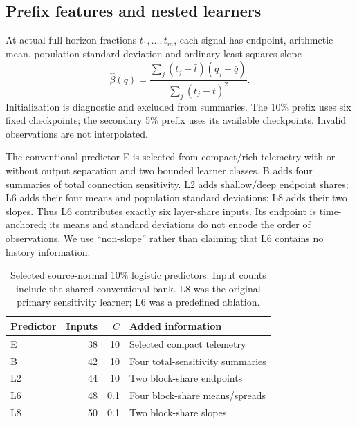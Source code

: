 \documentclass[nolineno]{ieeeaccess}
\begin{document}
\subsection{Prefix features and nested learners}
At actual full-horizon fractions $t_1,\ldots,t_m$, each signal has endpoint, arithmetic mean, population standard deviation and ordinary least-squares slope
\begin{equation}
\widehat\beta(q)=\frac{\sum_j(t_j-\bar t)(q_j-\bar q)}{\sum_j(t_j-\bar t)^2}.
\label{eq:slope}
\end{equation}
Initialization is diagnostic and excluded from summaries. The 10\% prefix uses six fixed checkpoints; the secondary 5\% prefix uses its available checkpoints. Invalid observations are not interpolated.

The conventional predictor E is selected from compact/rich telemetry with or without output separation and two bounded learner classes. B adds four summaries of total connection sensitivity. L2 adds shallow/deep endpoint shares; L6 adds their four means and population standard deviations; L8 adds their two slopes. Thus L6 contributes exactly six layer-share inputs. Its endpoint is time-anchored; its means and standard deviations do not encode the order of observations. We use ``non-slope'' rather than claiming that L6 contains no history information.

\begin{table}[t]
\caption{Selected source-normal 10\% logistic predictors. Input counts include the shared conventional bank. L8 was the original primary sensitivity learner; L6 was a predefined ablation.}
\label{tab:learners}
\centering\small
\begin{tabular}{lrr>{\raggedright\arraybackslash}p{3.4cm}}
\toprule Predictor & Inputs & $C$ & Added information\\\midrule
E &38&10&Selected compact telemetry\\
B &42&10&Four total-sensitivity summaries\\
L2&44&10&Two block-share endpoints\\
L6&48&0.1&Four block-share means/spreads\\
L8&50&0.1&Two block-share slopes\\\bottomrule
\end{tabular}
\end{table}
\end{document}
